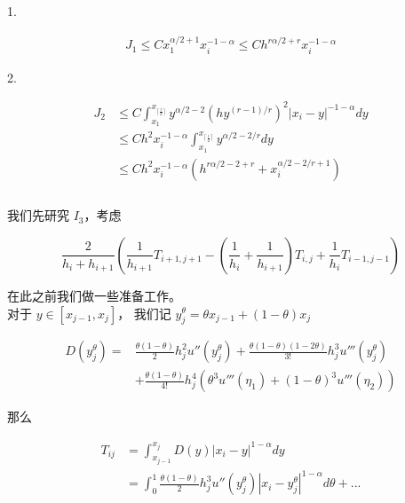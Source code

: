 \documentclass{ctexart}
\begin{document}
1. 

\begin{equation}
    \begin{aligned}
        J_1 \le C x_1^{\alpha/2+1} x_i^{-1-\alpha} \le C h^{r\alpha/2 +r} x_i^{-1-\alpha}
    \end{aligned}
\end{equation}


2.

\begin{equation}
    \begin{aligned}
        J_2 &\le C \int_{x_1}^{x_{\lceil \frac{i}{2}\rceil}} y^{\alpha/2-2} (h y^{(r-1)/r})^2 |x_i - y|^{-1-\alpha} dy      \\
        &\le C h^2 x_i^{-1-\alpha} \int_{x_1}^{x_{\lceil \frac{i}{2}\rceil}} y^{\alpha/2-2/r} dy    \\
        &\le C h^2 x_i^{-1-\alpha} (h^{r\alpha/2-2+r} + x_i^{\alpha/2-2/r+1})       \\
    \end{aligned}
\end{equation}
\\

我们先研究 \(I_3\)，考虑

\begin{equation}
    \frac{2}{h_i + h_{i+1}} 
    \left( \frac{1}{h_{i+1}} T_{i+1, j+1} 
    - (\frac{1}{h_{i}}+\frac{1}{h_{i+1}}) T_{i,j}
    +  \frac{1}{h_{i}} T_{i-1, j-1} \right)
\end{equation}

在此之前我们做一些准备工作。    \\
对于 \(y\in [x_{j-1}, x_j]\)， 我们记 \(y_j^\theta = \theta x_{j-1} + (1-\theta) x_j\)

\begin{equation}
    \begin{aligned}
        D(y_j^\theta) =& \frac{\theta (1-\theta)}{2} h_j^2 u''(y_j^\theta) + \frac{\theta (1-\theta)(1-2\theta)}{3!} h_j^3 u'''(y_j^\theta) \\
        &+ \frac{\theta (1-\theta)}{4!} h_j^4 (\theta^3 u'''(\eta_1) + (1-\theta)^3 u'''(\eta_2))
    \end{aligned}
\end{equation}

那么



\begin{equation}
    \begin{aligned}
        T_{ij} &= \int_{x_{j-1}}^{x_{j}} D(y) |x_i - y|^{1-\alpha} dy   \\
        & = \int_0^1 \frac{\theta (1-\theta)}{2} h_j^{3} u''(y_j^\theta) |x_i - y_j^\theta|^{1-\alpha} d\theta + ...
    \end{aligned}
\end{equation}
\end{document}
